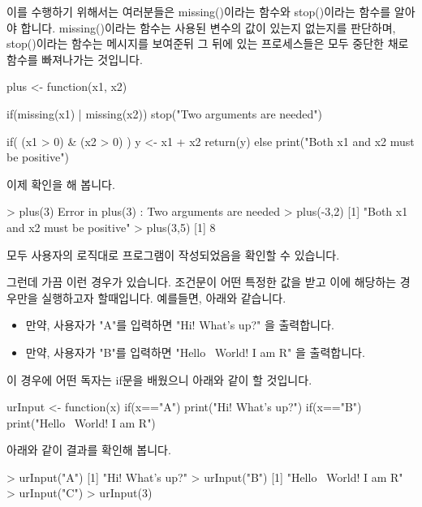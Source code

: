 이를 수행하기 위해서는 여러분들은 missing()이라는 함수와 stop()이라는 함수를 알아야 합니다. 
missing()이라는 함수는 사용된 변수의 값이 있는지 없는지를 판단하며, stop()이라는 함수는 메시지를 보여준뒤 그 뒤에 있는 프로세스들은 모두 중단한 채로 함수를 빠져나가는 것입니다. 

\begin{Schunk}
\begin{Soutput}
plus <- function(x1, x2){
	if(missing(x1) | missing(x2)) stop("Two arguments are needed")
	
	if( (x1 > 0) & (x2 > 0) ){
		y <- x1 + x2
		return(y)
	}
	else print("Both x1 and x2 must be positive")
}
\end{Soutput}
\end{Schunk}

이제 확인을 해 봅니다. 

\begin{Schunk}
\begin{Soutput}
> plus(3)
Error in plus(3) : Two arguments are needed
> plus(-3,2)
[1] "Both x1 and x2 must be positive"
> plus(3,5)
[1] 8
\end{Soutput}
\end{Schunk}

모두 사용자의 로직대로 프로그램이 작성되었음을 확인할 수 있습니다. 


그런데 가끔 이런 경우가 있습니다. 
조건문이 어떤 특정한 값을 받고 이에 해당하는 경우만을 실행하고자 할때입니다. 
예를들면, 아래와 같습니다.

\begin{itemize}
\item 만약, 사용자가 "A"를 입력하면 "Hi! What's up?" 을 출력합니다.
\item 만약, 사용자가 "B"를 입력하면 "Hello~ World! I am R" 을 출력합니다.
\end{itemize}

이 경우에 어떤 독자는 if문을 배웠으니 아래와 같이 할 것입니다.

\begin{Schunk}
\begin{Soutput}
urInput <- function(x){
	if(x=="A") print("Hi! What's up?")
	if(x=="B") print("Hello~ World! I am R")
}
\end{Soutput}
\end{Schunk}

아래와 같이 결과를 확인해 봅니다. 
\begin{Schunk}
\begin{Soutput}
> urInput("A")
[1] "Hi! What's up?"
> urInput("B")
[1] "Hello~ World! I am R"
> urInput("C")
> urInput(3)
\end{Soutput}
\end{Schunk}

